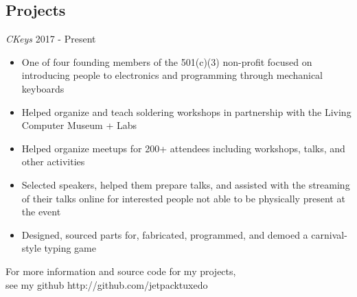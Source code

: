 \documentclass[line,margin]{res}
\newenvironment{tightcenter}{%
  \setlength\topsep{0pt}
  \setlength\parskip{0pt}
  \begin{center}
  }{\end{center}}
\begin{document}
\begin{resume}
  \section{\textcolor{TealBlue}{Projects}}
    {\sl CKeys} \hfill 2017 - Present
      \begin{itemize}  \itemsep -2pt %
        \item One of four founding members of the 501(c)(3) non-profit focused on introducing people to electronics and programming through mechanical keyboards
        \item Helped organize and teach soldering workshops in partnership with the Living Computer Museum + Labs
        \item Helped organize meetups for 200+ attendees including workshops, talks, and other activities
        \item Selected speakers, helped them prepare talks, and assisted with the streaming of their talks online for interested people not able to be physically present at the event
        \item Designed, sourced parts for, fabricated, programmed, and demoed a carnival-style typing game
      \end{itemize}

\end{resume}

\vfill
\begin{tightcenter}
For more information and source code for my projects,\\
see my github http://github.com/jetpacktuxedo
\end{tightcenter}
\end{document}
